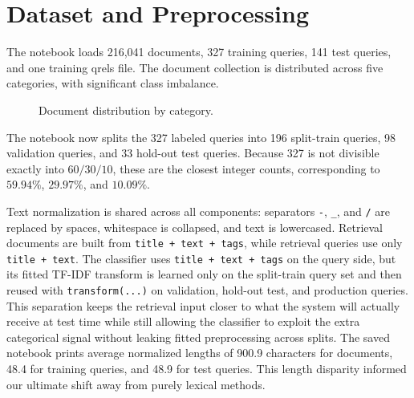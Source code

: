 \documentclass[11pt,a4paper]{article}
\begin{document}
\section{Dataset and Preprocessing}

The notebook loads 216,041 documents, 327 training queries, 141 test queries, and one training qrels file. The document collection is distributed across five categories, with significant class imbalance.

\begin{figure}[H]
\centering
{}
\caption{Document distribution by category.}
\end{figure}

The notebook now splits the 327 labeled queries into 196 split-train queries, 98 validation queries, and 33 hold-out test queries. Because 327 is not divisible exactly into \(60/30/10\), these are the closest integer counts, corresponding to \(59.94\%\), \(29.97\%\), and \(10.09\%\).

Text normalization is shared across all components: separators \texttt{-}, \texttt{\_}, and \texttt{/} are replaced by spaces, whitespace is collapsed, and text is lowercased. Retrieval documents are built from \texttt{title + text + tags}, while retrieval queries use only \texttt{title + text}. The classifier uses \texttt{title + text + tags} on the query side, but its fitted TF-IDF transform is learned only on the split-train query set and then reused with \texttt{transform(...)} on validation, hold-out test, and production queries. This separation keeps the retrieval input closer to what the system will actually receive at test time while still allowing the classifier to exploit the extra categorical signal without leaking fitted preprocessing across splits. The saved notebook prints average normalized lengths of 900.9 characters for documents, 48.4 for training queries, and 48.9 for test queries. This length disparity informed our ultimate shift away from purely lexical methods.
\end{document}
